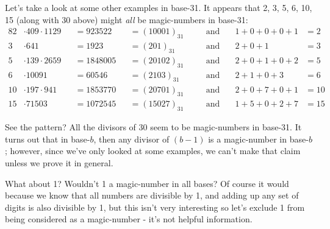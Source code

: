 \documentclass{article}
\begin{document}
Let's take a look at some other examples in base-31.
It appears that 2, 3, 5, 6, 10, 15 (along with 30 above)
might \emph{all} be magic-numbers in base-31:
\begin{alignat*}{8}
 2&\cdot{}409\cdot{}1129&&=923522  &&= (10001)_{31} &&\quad\text{and}\quad & 1+0+0+0+1&=2 \\
 3&\cdot{}641&&=1923               &&= (201)_{31}   &&\quad\text{and}\quad & 2+0+1&=3 \\
 5&\cdot{}139\cdot{}2659&&=1848005 &&= (20102)_{31} &&\quad\text{and}\quad & 2+0+1+0+2&=5 \\
 6&\cdot{}10091&&=60546            &&= (2103)_{31}  &&\quad\text{and}\quad & 2+1+0+3&=6 \\
10&\cdot{}197\cdot{}941&&=1853770  &&= (20701)_{31} &&\quad\text{and}\quad & 2+0+7+0+1&=10 \\
15&\cdot{}71503&&=1072545          &&= (15027)_{31} &&\quad\text{and}\quad & 1+5+0+2+7&=15
\end{alignat*}

See the pattern? All the divisors of 30 seem to be magic-numbers in base-31.
It turns out that in base-$b$, then any divisor of $(b-1)$ is a magic-number in base-$b$;
however, since we've only looked at some examples, we can't make that claim unless we prove it in general.

What about 1? Wouldn't 1 a magic-number in all bases? Of course it would because
we know that all numbers are divisible by 1, and adding up any set of digits is also 
divisible by 1, but this isn't very interesting
so let's exclude 1 from being considered as a magic-number - it's not helpful information.
\end{document}

